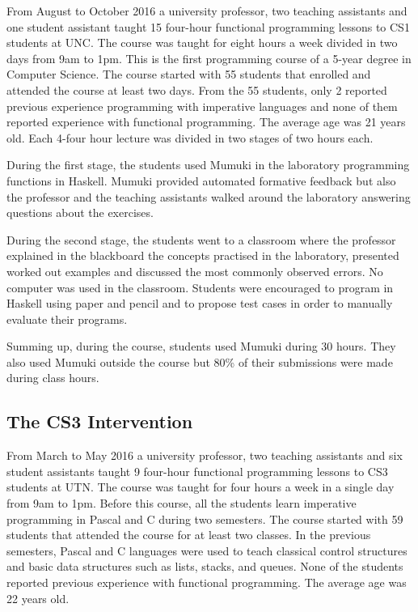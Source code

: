 From August to October 2016 a university professor, two teaching assistants and one student assistant taught 15 four-hour functional programming lessons to CS1 students at UNC. The course was taught for eight hours a week divided in two days from 9am to 1pm. This is the first programming course of a 5-year degree in Computer Science. The course started with 55 students that enrolled and attended the course at least two days. From the 55 students, only 2 reported previous experience programming with imperative languages and none of them reported experience with functional programming. The average age was 21 years old. Each 4-four hour lecture was divided in two stages of two hours each. 

During the first stage, the students used Mumuki in the laboratory programming functions in Haskell. Mumuki provided automated formative feedback but also the professor and the teaching assistants walked around the laboratory answering questions about the exercises. 

During the second stage, the students went to a classroom  where the professor explained in the blackboard the concepts practised in the laboratory, presented worked out examples and discussed the most commonly observed errors. No computer was used in the classroom. Students were encouraged to program in Haskell using paper and pencil and to propose test cases in order to manually evaluate their programs. 

Summing up, during the course, students used Mumuki during 30 hours. They also used Mumuki outside the course but 80\% of their submissions were made during class hours. 

\subsection{The CS3 Intervention}

From March to May 2016 a university professor, two teaching assistants and six student assistants taught 9 four-hour functional programming lessons to CS3 students at UTN. The course was taught for four hours a week in a single day from 9am to 1pm. Before this course, all the students learn imperative programming in Pascal and C during two semesters. The course started with 59 students that attended the course for at least two classes. In the previous  semesters, Pascal and C languages were used to teach classical control structures and basic data structures such as lists, stacks, and queues. None of the students reported previous experience with functional programming. The average age was 22 years old.

